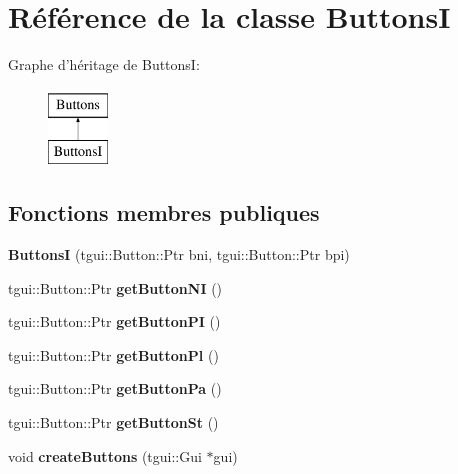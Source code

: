 \hypertarget{classButtonsI}{\section{Référence de la classe Buttons\+I}
\label{classButtonsI}
}
Graphe d'héritage de Buttons\+I\+:\begin{figure}[H]
\begin{center}
\leavevmode
\includegraphics[height=2.000000cm]{classButtonsI}
\end{center}
\end{figure}
\subsection*{Fonctions membres publiques}
\begin{DoxyCompactItemize}
\item 
\hypertarget{classButtonsI_add8708005f41ef4fac952c8a82dda809}{{\bfseries Buttons\+I} (tgui\+::\+Button\+::\+Ptr bni, tgui\+::\+Button\+::\+Ptr bpi)}\label{classButtonsI_add8708005f41ef4fac952c8a82dda809}

\item 
\hypertarget{classButtonsI_aecda6d6e3e44514421942ebe655eed79}{tgui\+::\+Button\+::\+Ptr {\bfseries get\+Button\+N\+I} ()}\label{classButtonsI_aecda6d6e3e44514421942ebe655eed79}

\item 
\hypertarget{classButtonsI_a0d59693afaa2c3c01952b37dc42aeb0d}{tgui\+::\+Button\+::\+Ptr {\bfseries get\+Button\+P\+I} ()}\label{classButtonsI_a0d59693afaa2c3c01952b37dc42aeb0d}

\item 
\hypertarget{classButtonsI_a77f7974ed70abfc6fbfc601a15ef1b61}{tgui\+::\+Button\+::\+Ptr {\bfseries get\+Button\+Pl} ()}\label{classButtonsI_a77f7974ed70abfc6fbfc601a15ef1b61}

\item 
\hypertarget{classButtonsI_a312da091b65cf79a9963590af5076d18}{tgui\+::\+Button\+::\+Ptr {\bfseries get\+Button\+Pa} ()}\label{classButtonsI_a312da091b65cf79a9963590af5076d18}

\item 
\hypertarget{classButtonsI_a66e442c75b0110fdd73be6c7d8ea7b19}{tgui\+::\+Button\+::\+Ptr {\bfseries get\+Button\+St} ()}\label{classButtonsI_a66e442c75b0110fdd73be6c7d8ea7b19}

\item 
\hypertarget{classButtonsI_ae79aa6a17f1251f34bffa009fcc0a2cd}{void {\bfseries create\+Buttons} (tgui\+::\+Gui $\ast$gui)}\label{classButtonsI_ae79aa6a17f1251f34bffa009fcc0a2cd}

\end{DoxyCompactItemize}


